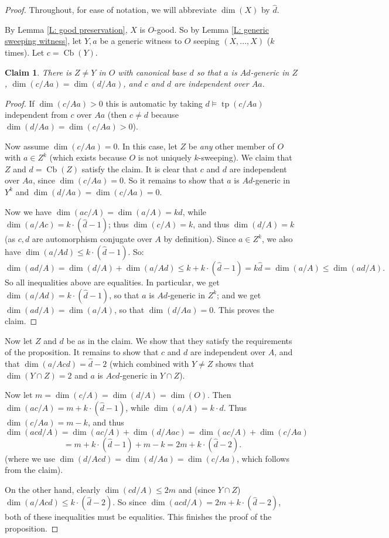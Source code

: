 \documentclass{amsart}
\newtheorem{claim}[theorem]{Claim}
\theoremstyle{definition}
\newcommand{\tp}{\operatorname{tp}}
\begin{document}
\begin{proof}

    Throughout, for ease of notation, we will abbreviate $\dim(X)$ by $\hat d$.
    
    By Lemma \ref{L: good preservation}, $X$ is $O$-good. So by Lemma \ref{L: generic sweeping witness}, let $Y,a$ be a generic witness to $O$ seeping $(X,...,X)$ ($k$ times). Let $c=\operatorname{Cb}(Y)$.
    
    \begin{claim}
        There is $Z\neq Y$ in $O$ with canonical base $d$ so that $a$ is $Ad$-generic in $Z$, $\dim(c/Aa)=\dim(d/Aa)$, and $c$ and $d$ are independent over $Aa$. 
    \end{claim}
    \begin{proof}
        If $\dim(c/Aa)>0$ this is automatic by taking $d\models\tp(c/Aa)$ independent from $c$ over $Aa$ (then $c\neq d$ because $\dim(d/Aa)=\dim(c/Aa)>0$).

        Now assume $\dim(c/Aa)=0$. In this case, let $Z$ be \textit{any} other member of $O$ with $a\in Z^k$ (which exists because $O$ is not uniquely $k$-sweeping). We claim that $Z$ and $d=\operatorname{Cb}(Z)$ satisfy the claim. It is clear that $c$ and $d$ are independent over $Aa$, since $\dim(c/Aa)=0$. So it remains to show that $a$ is $Ad$-generic in $Y^k$ and $\dim(d/Aa)=\dim(c/Aa)=0$.
        
        Now we have $\dim(ac/A)=\dim(a/A)=k\hat d$, while $\dim(a/Ac)=k\cdot(\hat d-1)$; thus $\dim(c/A)=k$, and thus $\dim(d/A)=k$ (as $c,d$ are automorphism conjugate over $A$ by definition). Since $a\in Z^k$, we also have $\dim(a/Ad)\leq k\cdot(\hat d-1)$. So: $$\dim(ad/A)=\dim(d/A)+\dim(a/Ad)\leq k+k\cdot(\hat d-1)=k\hat d=\dim(a/A)\leq\dim(ad/A).$$ So all inequalities above are equalities. In particular, we get $\dim(a/Ad)=k\cdot(\hat d-1)$, so that $a$ is $Ad$-generic in $Z^k$; and we get $\dim(ad/A)=\dim(a/A)$, so that $\dim(d/Aa)=0$. This proves the claim.
        \end{proof}
        
        Now let $Z$ and $d$ be as in the claim. We show that they satisfy the requirements of the proposition. It remains to show that $c$ and $d$ are independent over $A$, and that $\dim(a/Acd)=\hat d-2$ (which combined with $Y\neq Z$ shows that $\dim(Y\cap Z)=2$ and $a$ is $Acd$-generic in $Y\cap Z$).
        
        Now let $m=\dim(c/A)=\dim(d/A)=\dim(O)$. Then $\dim(ac/A)=m+k\cdot(\hat d-1)$, while $\dim(a/A)=k\cdot d$. Thus $\dim(c/Aa)=m-k$, and thus $$\dim(acd/A)=\dim(ac/A)+\dim(d/Aac)=\dim(ac/A)+\dim(c/Aa)$$ $$=m+k\cdot(\hat d-1)+m-k=2m+k\cdot(\hat d-2).$$ (where we use $\dim(d/Acd)=\dim(d/Aa)=\dim(c/Aa)$, which follows from the claim).
        
        On the other hand, clearly $\dim(cd/A)\leq 2m$ and (since $Y\cap Z$) $\dim(a/Acd)\leq k\cdot(\hat d-2)$. So since $\dim(acd/A)=2m+k\cdot(\hat d-2)$, both of these inequalities must be equalities. This finishes the proof of the proposition.
\end{proof}
\end{document}

